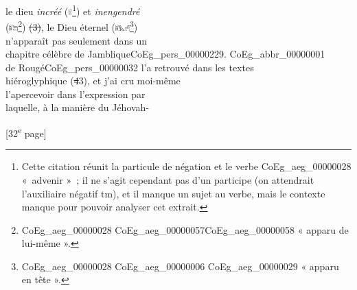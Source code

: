 \documentclass{book}
\begin{document}
{\begin{paracol}{2}
le dieu \textit{incréé} (\includegraphics[height=6pt]{CoEg_Mariette_hiero_1857-04-01_31_3.png}\hypertarget{CoEg_Mariette_1857-04-01_31}{}\footnote{Cette citation réunit la particule de négation et le verbe \foreignlanguage{translit}{\gls{CoEg_aeg_00000028}} «~advenir »~; il ne s'agit cependant pas d'un participe (on attendrait l'auxiliaire négatif \foreignlanguage{translit}{tm}), et il manque un sujet au verbe, mais le contexte manque pour pouvoir analyser cet extrait.}) et \textit{inengendré}\\
(\includegraphics[height=6pt]{CoEg_Mariette_hiero_1857-04-01_31_4.png}\footnote{\foreignlanguage{translit}{\Gls{CoEg_aeg_00000028} \gls{CoEg_aeg_00000057}\gls{CoEg_aeg_00000058}} « apparu de lui-même ».}) \sout{(3)}, le Dieu éternel (\includegraphics[height=6pt]{CoEg_Mariette_hiero_1857-04-01_31_5.png}\footnote{\foreignlanguage{translit}{\Gls{CoEg_aeg_00000028} \gls{CoEg_aeg_00000006} \gls{CoEg_aeg_00000029}} « apparu en tête ».})\\
n’apparaît pas seulement dans un\\
chapitre célèbre de Jamblique\gls{CoEg_pers_00000229}. \gls{CoEg_abbr_00000001}\\
de Rougé\gls{CoEg_pers_00000032} l’a retrouvé dans les textes\\
hiéroglyphique (\sout{4}3), et j’ai cru moi-même\\
l’apercevoir dans l’expression par\\
laquelle, à la manière du Jéhovah-
\end{paracol}

{\footnotesize\begin{center} {[32\textsuperscript{e} page]}\end{center}}

}
\end{document}
